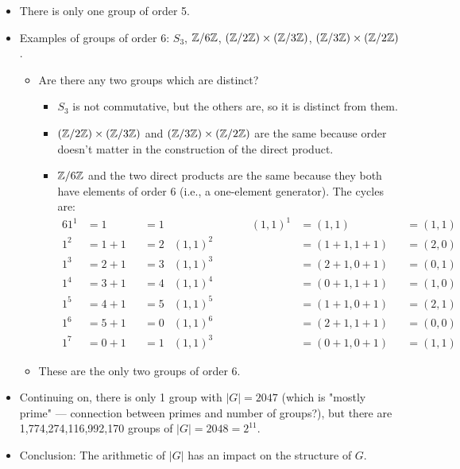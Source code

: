 \documentclass[../notes.tex]{subfiles}
\begin{document}
\begin{itemize}
    \item There is only one group of order 5.
    \item Examples of groups of order 6: $S_3$, $\mathbb{Z}/6\mathbb{Z}$, $(\mathbb{Z}/2\mathbb{Z})\times(\mathbb{Z}/3\mathbb{Z})$, $(\mathbb{Z}/3\mathbb{Z})\times(\mathbb{Z}/2\mathbb{Z})$.
    \begin{itemize}
        \item Are there any two groups which are distinct?
        \begin{itemize}
            \item $S_3$ is not commutative, but the others are, so it is distinct from them.
            \item $(\mathbb{Z}/2\mathbb{Z})\times(\mathbb{Z}/3\mathbb{Z})$ and $(\mathbb{Z}/3\mathbb{Z})\times(\mathbb{Z}/2\mathbb{Z})$ are the same because order doesn't matter in the construction of the direct product.
            \item $\mathbb{Z}/6\mathbb{Z}$ and the two direct products are the same because they both have elements of order 6 (i.e., a one-element generator). The cycles are:
            \begin{alignat*}{6}
                1^1 &= 1 &&= 1&\hspace{7em}
                    (1,1)^1 &= (1,1) &&= (1,1)\\
                1^2 &= 1+1 &&= 2&
                    (1,1)^2 &= (1+1,1+1) &&= (2,0)\\
                1^3 &= 2+1 &&= 3&
                    (1,1)^3 &= (2+1,0+1) &&= (0,1)\\
                1^4 &= 3+1 &&= 4&
                    (1,1)^4 &= (0+1,1+1) &&= (1,0)\\
                1^5 &= 4+1 &&= 5&
                    (1,1)^5 &= (1+1,0+1) &&= (2,1)\\
                1^6 &= 5+1 &&= 0&
                    (1,1)^6 &= (2+1,1+1) &&= (0,0)\\
                1^7 &= 0+1 &&= 1&
                    (1,1)^3 &= (0+1,0+1) &&= (1,1)
            \end{alignat*}
        \end{itemize}
        \item These are the only two groups of order 6.
    \end{itemize}
    \item Continuing on, there is only 1 group with $|G|=2047$ (which is "mostly prime" --- connection between primes and number of groups?), but there are 1,774,274,116,992,170 groups of $|G|=2048=2^{11}$.
    \item Conclusion: The arithmetic of $|G|$ has an impact on the structure of $G$.
\end{itemize}
\end{document}
